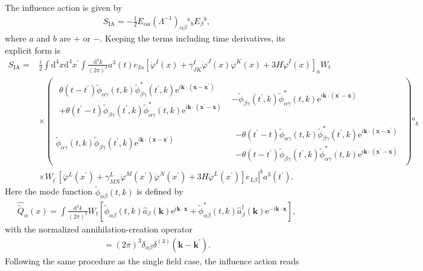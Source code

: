 \documentclass[aps, prd
, preprint
, nofootinbib 
]{revtex4-1}
\newcommand{\dd}{\mathrm{d}}
\newcommand{\ee}{\mathrm{e}}
\newcommand{\dk}{\frac{\dd^3k}{(2\pi)^3}}
\newcommand{\bae}[1]{\begin{align} #1 \end{align}}
\newcommand{\bpme}[1]{\begin{pmatrix} #1 \end{pmatrix}}
\begin{document}
The influence action is given by
\bae{
	S_\text{IA}=-\frac{1}{2}E_{\alpha a}(\Lambda^{-1})_{\alpha\beta}{}^a{}_bE_\beta{}^b,
}
where $a$ and $b$ are $+$ or $-$.
Keeping the terms including time derivatives, its explicit form is
\bae{
	S_\text{IA}=&\frac{i}{2}\int\dd^4x\dd^4x^\prime\int\dk a^3(t)e_{I\alpha}\left[\ddot{\varphi}^I(x)+\gamma^I_{JK}\dot{\varphi}^J(x)\dot{\varphi}^K(x)
	+3H\dot{\varphi}^I(x)\right]_aW_t \nonumber \\
	&\times\bpme{
		\begin{array}{c}
			\theta(t-t^\prime)\tilde{\phi}_{\alpha\gamma}(t,k)\tilde{\phi}_{\beta\gamma}^*(t^\prime,k)
			\ee^{i\mathbf{k}\cdot(\mathbf{x}-\mathbf{x}^\prime)} \\
			+\theta(t^\prime-t)\tilde{\phi}_{\beta\gamma}(t^\prime,k)\tilde{\phi}_{\alpha\gamma}^*(t,k)
			\ee^{i\mathbf{k}\cdot(\mathbf{x}^\prime-\mathbf{x})}
		\end{array}
		& -\tilde{\phi}_{\beta\gamma}(t^\prime,k)\tilde{\phi}_{\alpha\gamma}^*(t,k)\ee^{i\mathbf{k}\cdot(\mathbf{x}^\prime-\mathbf{x})} \\
		\tilde{\phi}_{\alpha\gamma}(t,k)\tilde{\phi}_{\beta\gamma}(t^\prime,k)\ee^{i\mathbf{k}\cdot(\mathbf{x}-\mathbf{x}^\prime)} &
		\begin{array}{c}
			-\theta(t^\prime-t)\tilde{\phi}_{\alpha\gamma}(t,k)\tilde{\phi}_{\beta\gamma}^*(t^\prime,k)
			\ee^{i\mathbf{k}\cdot(\mathbf{x}-\mathbf{x}^\prime)} \\
			-\theta(t-t^\prime)\tilde{\phi}_{\beta\gamma}(t^\prime,k)\tilde{\phi}_{\alpha\gamma}^*(t,k)
			\ee^{i\mathbf{k}\cdot(\mathbf{x}^\prime-\mathbf{x})}
		\end{array}
	}{}^a{}_b \nonumber \\
	&\times W_{t^\prime}\left.\left[\ddot{\varphi}^L(x^\prime)+\gamma^L_{MN}\dot{\varphi}^M(x^\prime)\dot{\varphi}^N(x^\prime)
	+3H\dot{\varphi}^L(x^\prime)\right]e_{L\beta}\right|^ba^3(t^\prime).
}
Here the mode function $\tilde{\phi}_{\alpha\beta}(t,k)$ is defined by
\bae{
	\hat{\tilde{Q}}_{\alpha}(x)=\int\dk W_t\left[\tilde{\phi}_{\alpha\beta}(t,k)\hat{a}_\beta(\mathbf{k})\ee^{i\mathbf{k}\cdot\mathbf{x}}
	+\tilde{\phi}_{\alpha\beta}^*(t,k)\hat{a}_\beta^\dagger(\mathbf{k})\ee^{-i\mathbf{k}\cdot\mathbf{x}}\right],
}
with the normalized annihilation-creation operator
\bae{
	[\hat{a}_\alpha(\mathbf{k}),\hat{a}_\beta^\dagger(\mathbf{k}^\prime)]=(2\pi)^3\delta_{\alpha\beta}\delta^{(3)}(\mathbf{k}-\mathbf{k}^\prime).
}
Following the same procedure as the single field case, the influence action reads
\end{document}
